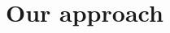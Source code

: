 \documentclass[preprint,12pt,authoryear]{elsarticle}
\begin{document}












\section{Our approach}


\end{document}
